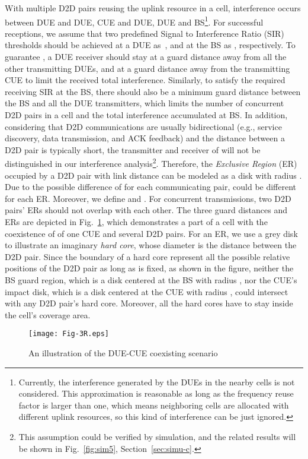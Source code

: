 \documentclass[journal, 10pt]{IEEEtran}
\begin{document}
With multiple D2D pairs reusing the uplink resource in a cell,
interference occurs between DUE and DUE, CUE and DUE, DUE and
BS\footnote{Currently, the interference generated by the DUEs in the
nearby cells is not considered. This approximation is reasonable as
long as the frequency reuse factor is larger than one, which means
neighboring cells are allocated with different uplink resources, so
this kind of interference can be just ignored.}. For successful
receptions, we assume that two predefined Signal to Interference Ratio
(SIR) thresholds should be achieved at a DUE as~,
and at the BS as , respectively. 
To guarantee , a DUE receiver should stay at a
guard distance  away from all the other transmitting
DUEs, and at a guard distance  away from the
transmitting CUE to limit the received total interference. Similarly,
to satisfy the required receiving SIR  at the BS,
there should also be a minimum guard distance  between
the BS and all the DUE transmitters, which limits the number of
concurrent D2D pairs in a cell and the total interference accumulated
at BS. In addition, considering that D2D communications are usually
bidirectional (e.g., service discovery, data transmission, and ACK
feedback) and the distance between a D2D pair is typically short, the
transmitter and receiver of  will not be
distinguished in our interference analysis\footnote{This assumption
could be verified by simulation, and the related results will be shown
in Fig.~\ref{fig:sim5}, Section~\ref{sec:simu-c}.}. Therefore, the
\emph{Exclusive Region} (ER) occupied by a D2D pair with link distance
 can be modeled as a disk with radius . Due to the possible difference of
 for each communicating pair,  could be
different for each ER. Moreover, we define  and . For concurrent transmissions, two
D2D pairs' ERs should not overlap with each other. 
The three guard distances and ERs are depicted in
Fig.~\ref{fig:model3r}, which demonstrates a part of a cell with the
coexistence of of one CUE and several D2D pairs. For an ER, we use a
grey disk to illustrate an imaginary \emph{hard core}, whose diameter
is the distance between the D2D pair. Since the boundary of a hard
core represent all the possible relative positions of the D2D pair as
long as  is fixed, as shown in the figure, neither the
BS guard region, which is a disk centered at the BS with radius
, nor the CUE's impact disk, which is a disk centered at
the CUE with radius , could intersect with any D2D
pair's hard core. Moreover, all the hard cores have to stay inside the
cell's coverage area. 
\begin{figure}[!h] \centering
\texttt{[image: Fig-3R.eps]} \caption{An illustration of the DUE-CUE coexisting scenario} 
\label{fig:model3r} 
\end{figure}
\end{document}
